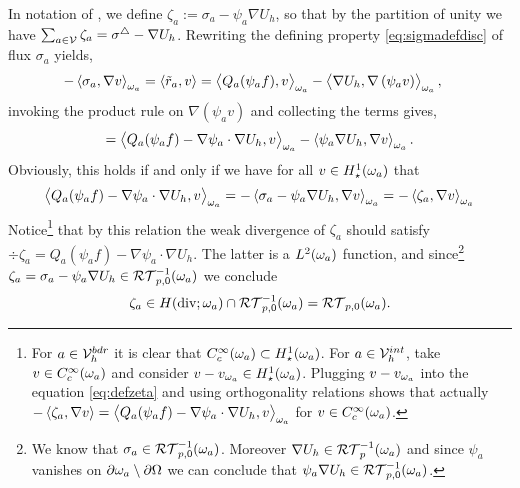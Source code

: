 \documentclass[thesis.tex]{subfiles}
\begin{document}
In notation of \cite{ernequil}, we define $\zeta_a := \sigma_a - \psi_a \nabla U_h$, so that by the partition of unity we have 
$\sum_{a \in \mathcal{V}} \zeta_a = \sigma^\triangle - \nabla U_h$. Rewriting the defining property \eqref{eq:sigmadefdisc} of flux $\sigma_a$ yields,
\begin{align*}
  -\left \langle \sigma_a, \nabla v \right \rangle_{\omega_a}  = \left \langle \tilde r_a, v \right \rangle &=  \left \langle Q_a(\psi_a f), v \right \rangle_{\omega_a} - \left \langle \nabla U_h, \nabla \left(\psi_a v\right) \right \rangle_{\omega_a},
\end{align*}
invoking the product rule on $\nabla \left(\psi_a v\right)$ and collecting the terms gives,
\[
  =  \left \langle Q_a(\psi_a f) - \nabla \psi_a \cdot \nabla U_h, v \right \rangle_{\omega_a} - \left \langle \psi_a \nabla U_h, \nabla v \right \rangle_{\omega_a}.
\]
Obviously, this holds if and only if  we have for all $v \in H_\star^1(\omega_a)$ that
\begin{equation}
  \label{eq:defzeta}
  \left \langle Q_a(\psi_a f) - \nabla \psi_a \cdot \nabla U_h, v \right \rangle_{\omega_a} = - \left \langle \sigma_a - \psi_a \nabla U_h, \nabla v \right \rangle_{\omega_a} = - \left \langle \zeta_a, \nabla v \right \rangle_{\omega_a} 
\end{equation}
Notice\footnote{
For $a\in \mathcal{V}_h^{bdr}$ it is clear that $C_c^{\infty}(\omega_a) \subset H_\star^1(\omega_a)$. For $a \in \mathcal{V}_h^{int}$, take $v \in C_c^{\infty}(\omega_a)$ and consider $v - v_{\omega_a} \in H_\star^1(\omega_a)$. Plugging $v - v_{\omega_a}$ into the equation \eqref{eq:defzeta} and using orthogonality relations shows that actually $ - \left \langle \zeta_a, \nabla v \right \rangle = \left \langle Q_a(\psi_a f) - \nabla \psi_a \cdot \nabla U_h, v \right \rangle_{\omega_a}$ for $v \in C_c^{\infty}(\omega_a)$.}
that by this relation the weak divergence  of $\zeta_a$ should satisfy $\div \zeta_a = Q_a(\psi_a f) - \nabla \psi_a\cdot \nabla U_h$.
The latter is a $L^2(\omega_a)$ function, and since\footnote{We know that $\sigma_a\in \mathcal{RT}_{p,0}^{-1}(\omega_a)$. Moreover $\nabla U_h \in \mathcal{RT}_p^{-1}(\omega_a)$ and since $\psi_a$ vanishes on $\partial \omega_a \setminus \partial \Omega$ we can conclude that $\psi_a\nabla U_h \in \mathcal{RT}_{p,0}^{-1}(\omega_a)$.
} $\zeta_a = \sigma_a - \psi_a\nabla U_h \in \mathcal{RT}_{p,0}^{-1}(\omega_a)$ we conclude
\[
  \zeta_a \in H(\operatorname{div}; \omega_a) \cap \mathcal{RT}_{p,0}^{-1}(\omega_a) = \mathcal{RT}_{p,0}(\omega_a).
\]
\end{document}
